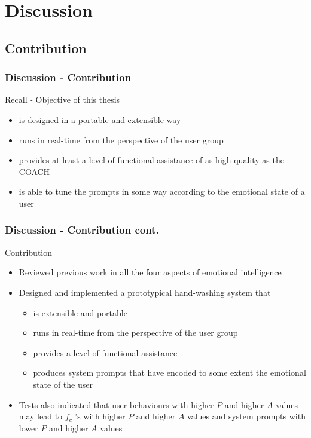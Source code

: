 \documentclass{beamer}
\begin{document}
\section{Discussion}

\subsection{Contribution}
\begin{frame}
\frametitle{Discussion - Contribution}
Recall - Objective of this thesis
\begin{itemize}
\item is designed in a portable and extensible way
\item runs in real-time from the perspective of the user group
\item provides at least a level of functional assistance of as high quality as the COACH
\item is able to tune the prompts in some way according to the emotional state of a user
\end{itemize}
\end{frame}


\begin{frame}
\frametitle{Discussion - Contribution cont.}
Contribution
\begin{itemize}
\pause \item Reviewed previous work in all the four aspects of emotional intelligence
\pause \item Designed and implemented a prototypical hand-washing system that
\begin{itemize}
\item is extensible and portable
\item runs in real-time from the perspective of the user group
\item provides a level of functional assistance
\item produces system prompts that have encoded to some extent the emotional state of the user
\end{itemize}
\pause \item Tests also indicated that user behaviours with higher $P$ and higher $A$ values may lead to $f_c$ 's with higher $P$ and higher $A$ values and system prompts with lower $P$ and higher $A$ values
\end{itemize}
\end{frame}
\end{document}
